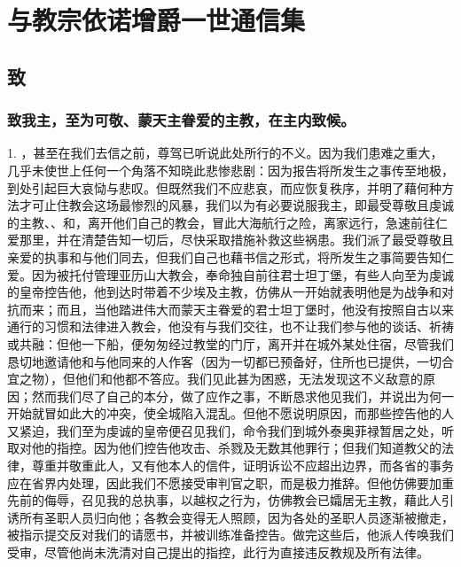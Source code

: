 
\chapter{与教宗依诺增爵一世通信集}



\section{致}


\subsection{致我主，至为可敬、蒙天主眷爱的主教，在主内致候。}

1. ，甚至在我们去信之前，尊驾已听说此处所行的不义。因为我们患难之重大，几乎未使世上任何一个角落不知晓此悲惨悲剧：因为报告将所发生之事传至地极，到处引起巨大哀恸与悲叹。但既然我们不应悲哀，而应恢复秩序，并明了藉何种方法才可止住教会这场最惨烈的风暴，我们以为有必要说服我主，即最受尊敬且虔诚的主教、、和，离开他们自己的教会，冒此大海航行之险，离家远行，急速前往仁爱那里，并在清楚告知一切后，尽快采取措施补救这些祸患。我们派了最受尊敬且亲爱的执事和与他们同去，但我们自己也藉书信之形式，将所发生之事简要告知仁爱。因为被托付管理亚历山大教会，奉命独自前往君士坦丁堡，有些人向至为虔诚的皇帝控告他，他到达时带着不少埃及主教，仿佛从一开始就表明他是为战争和对抗而来；而且，当他踏进伟大而蒙天主眷爱的君士坦丁堡时，他没有按照自古以来通行的习惯和法律进入教会，他没有与我们交往，也不让我们参与他的谈话、祈祷或共融：但他一下船，便匆匆经过教堂的门厅，离开并在城外某处住宿，尽管我们恳切地邀请他和与他同来的人作客（因为一切都已预备好，住所也已提供，一切合宜之物），但他们和他都不答应。我们见此甚为困惑，无法发现这不义敌意的原因；然而我们尽了自己的本分，做了应作之事，不断恳求他见我们，并说出为何一开始就冒如此大的冲突，使全城陷入混乱。但他不愿说明原因，而那些控告他的人又紧迫，我们至为虔诚的皇帝便召见我们，命令我们到城外泰奥菲禄暂居之处，听取对他的指控。因为他们控告他攻击、杀戮及无数其他罪行；但我们知道教父的法律，尊重并敬重此人，又有他本人的信件，证明诉讼不应超出边界，而各省的事务应在省界内处理，因此我们不愿接受审判官之职，而是极力推辞。但他仿佛要加重先前的侮辱，召见我的总执事，以越权之行为，仿佛教会已孀居无主教，藉此人引诱所有圣职人员归向他；各教会变得无人照顾，因为各处的圣职人员逐渐被撤走，被指示提交反对我们的请愿书，并被训练准备控告。做完这些后，他派人传唤我们受审，尽管他尚未洗清对自己提出的指控，此行为直接违反教规及所有法律。\par

